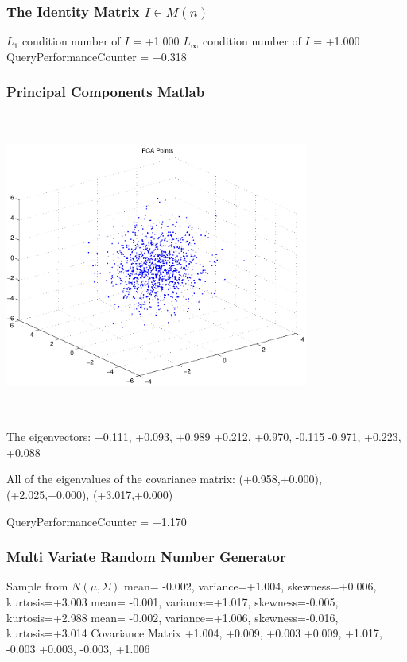 \documentclass[9pt]{article}
\theoremstyle{plain}
\theoremstyle{definition}
\theoremstyle{remark}
\numberwithin{equation}{section}
\begin{document}
\subsubsection{The Identity Matrix $I \in M(n)$}
$L_1$ condition number of $I$ = +1.000
$L_\infty$ condition number of $I$ = +1.000
QueryPerformanceCounter  =  +0.318
\subsubsection{Principal Components Matlab }
\includegraphics[width=10.0cm,height=10.0cm]{PCAPoints.pdf}

The eigenvectors:
+0.111, +0.093, +0.989
+0.212, +0.970, -0.115
-0.971, +0.223, +0.088

All of the eigenvalues of the covariance matrix:
(+0.958,+0.000), (+2.025,+0.000), (+3.017,+0.000)

QueryPerformanceCounter  =  +1.170
\subsubsection{Multi Variate Random Number Generator }
Sample from $N(\mu,\Sigma)$
mean= -0.002, variance=+1.004, skewness=+0.006, kurtosis=+3.003
mean= -0.001, variance=+1.017, skewness=-0.005, kurtosis=+2.988
mean= -0.002, variance=+1.006, skewness=-0.016, kurtosis=+3.014
Covariance Matrix 
+1.004, +0.009, +0.003
+0.009, +1.017, -0.003
+0.003, -0.003, +1.006
\end{document}
